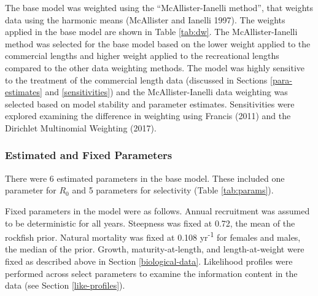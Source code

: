 \documentclass[11pt,
  english,
  a4paper,
]{article}
\begin{document}
\leavevmode\tagmcend\tagstructend\par


The base model was weighted using the ``McAllister-Ianelli method'', that weights data using the harmonic means {(McAllister and Ianelli 1997)\leavevmode\tagmcend\tagstructend}. The weights applied in the base model are shown in Table \ref{tab:dw}. The McAllister-Ianelli method was selected for the base model based on the lower weight applied to the commercial lengths and higher weight applied to the recreational lengths compared to the other data weighting methods. The model was highly sensitive to the treatment of the commercial length data (discussed in Sections \ref{para-estimates} and \ref{sensitivities}) and the McAllister-Ianelli data weighting was selected based on model stability and parameter estimates. Sensitivities were explored examining the difference in weighting using Francis {(2011)\leavevmode\tagmcend\tagstructend} and the Dirichlet Multinomial Weighting {(2017)\leavevmode\tagmcend\tagstructend}.

\leavevmode\tagmcend\tagstructend\par


\hypertarget{estimated-and-fixed-parameters}{%
\subsubsection{Estimated and Fixed Parameters}\label{estimated-and-fixed-parameters}}

\leavevmode\tagmcend\tagstructend


There were 6 estimated parameters in the base model. These included one parameter for {\(R_0\)\leavevmode\tagmcend\tagstructend} and 5 parameters for selectivity (Table \ref{tab:params}).

\leavevmode\tagmcend\tagstructend\par


Fixed parameters in the model were as follows. Annual recruitment was assumed to be deterministic for all years. Steepness was fixed at 0.72, the mean of the rockfish prior. Natural mortality was fixed at 0.108 yr\textsuperscript{-1} for females and males, the median of the prior. Growth, maturity-at-length, and length-at-weight were fixed as described above in Section \ref{biological-data}. Likelihood profiles were performed across select parameters to examine the information content in the data (see Section \ref{like-profiles}).
\end{document}
